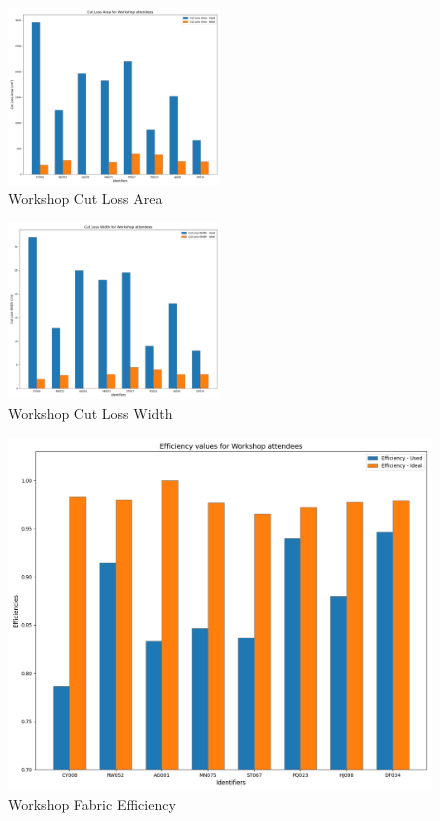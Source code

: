 \begin{figure} [H]
    \centering
    \includegraphics[width = 0.5\textwidth]{Images/Workshop_CutLossArea_Bar.png}
    \caption{Workshop Cut Loss Area}
\end{figure}
\begin{figure} [H]
    \centering
    \includegraphics[width = 0.5\textwidth]{Images/Workshop_CutLossWidth_Bar.png}
    \caption{Workshop Cut Loss Width}
\end{figure}
\begin{figure} [H]
    \centering
    \includegraphics[width = \textwidth]{Images/Workshop_Eff_bar.png}
    \caption{Workshop Fabric Efficiency}
\end{figure}
